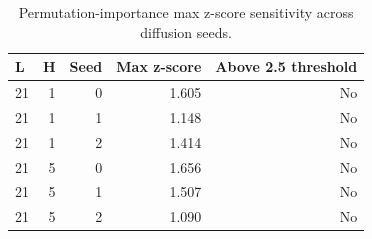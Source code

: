 \begin{table}[!htbp]
\centering
\caption{Permutation-importance max z-score sensitivity across diffusion seeds.}
\label{tab:xai-seed-sensitivity}
\begin{tabular}{lrrrr}
\toprule
L & H & Seed & Max z-score & Above 2.5 threshold \\
\midrule
21 & 1 & 0 & 1.605 & No \\
21 & 1 & 1 & 1.148 & No \\
21 & 1 & 2 & 1.414 & No \\
21 & 5 & 0 & 1.656 & No \\
21 & 5 & 1 & 1.507 & No \\
21 & 5 & 2 & 1.090 & No \\
\bottomrule
\end{tabular}
\end{table}
